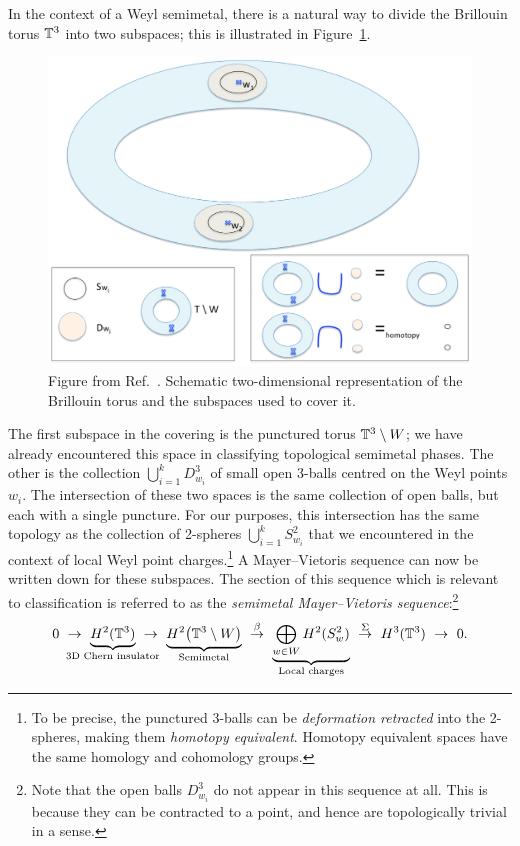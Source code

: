 In the context of a Weyl semimetal, there is a natural way to divide the Brillouin torus $\mathbb{T}^3$ into two subspaces; this is illustrated in Figure~\ref{fig:semimetal-MV}.
\begin{figure}[htb!]
	\centering
	\includegraphics[width=.8\linewidth]{Images/semimetal-MV}
	\caption{Figure from Ref.~\cite{Mathai_math-review}. Schematic two-dimensional representation of the Brillouin torus and the subspaces used to cover it.}
	\label{fig:semimetal-MV}
\end{figure}
The first subspace in the covering is the punctured torus $\mathbb{T}^3\setminus W$; we have already encountered this space in classifying topological semimetal phases. The other is the collection $\bigcup_{i=1}^k D_{w_i}^3$ of small open 3-balls centred on the Weyl points $w_i$. The intersection of these two spaces is the same collection of open balls, but each with a single puncture. For our purposes, this intersection has the same topology as the collection of 2-spheres $\bigcup_{i=1}^k S_{w_i}^2$ that we encountered in the context of local Weyl point charges.\footnote{
	To be precise, the punctured 3-balls can be \emph{deformation retracted} into the 2-spheres, making them \emph{homotopy equivalent}. Homotopy equivalent spaces have the same homology and cohomology groups.}
A Mayer--Vietoris sequence can now be written down for these subspaces. The section of this sequence which is relevant to classification is referred to as the \emph{semimetal Mayer--Vietoris sequence}:\footnote{
	Note that the open balls $D_{w_i}^3$ do not appear in this sequence at all. This is because they can be contracted to a point, and hence are topologically trivial in a sense.}
\begin{equation}\label{eq:semimetal-MV-symbolic}
	0\ \to\ \underbrace{H^2(\T^3)}_{\mathclap{\text{3D Chern insulator}}}\ \to\ 
	\underbrace{H^2\big(\T^3\setminus W\big)}_{\text{Semimetal}}\ \overset{\beta}{\to}\ \underbrace{\bigoplus_{w\in W} H^2(S_w^2)}_{\text{Local charges}}\ \overset{\Sigma}{\to}\ H^3(\T^3)\ \to\ 0.
\end{equation}
